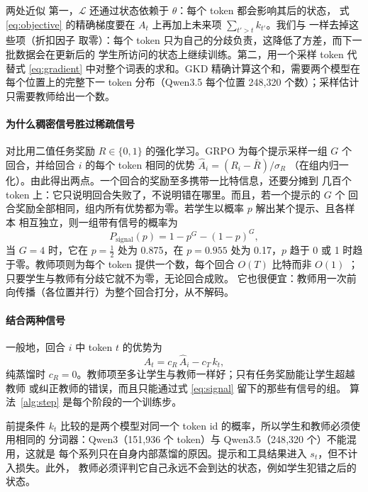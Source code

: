 \documentclass[11pt,a4paper,fontset=none]{ctexart}
\begin{document}
\begin{notebox}{两处近似}
第一，$\mathcal{L}$ 还通过状态依赖于 $\theta$：每个 token 都会影响其后的状态，
式 \eqref{eq:objective} 的精确梯度要在 $A_t$ 上再加上未来项
$\sum_{t'>t}k_{t'}$。我们与 \citet{lu2025onpolicy} 一样去掉这些项（折扣因子
取零）：每个 token 只为自己的分歧负责，这降低了方差，而下一批数据会在更新后的
学生所访问的状态上继续训练。第二，用一个采样 token 代替式 \eqref{eq:gradient}
中对整个词表的求和。GKD \citep{agarwal2024gkd} 精确计算这个和，需要两个模型在
每个位置上的完整下一 token 分布（Qwen3.5 每个位置 248{,}320 个数）；采样估计
只需要教师给出一个数。
\end{notebox}

\paragraph{为什么稠密信号胜过稀疏信号}
对比用二值任务奖励 $R\in\{0,1\}$ 的强化学习。GRPO 为每个提示采样一组 $G$ 个
回合，并给回合 $i$ 的每个 token 相同的优势 $\hat A_i=(R_i-\bar R)/\sigma_R$
（在组内归一化）。由此得出两点。一个回合的奖励至多携带一比特信息，还要分摊到
几百个 token 上：它只说明回合失败了，不说明错在哪里。而且，若一个提示的 $G$ 个
回合奖励全部相同，组内所有优势都为零。若学生以概率 $p$ 解出某个提示、且各样本
相互独立，则一组带有信号的概率为
\begin{equation}
  P_{\text{signal}}(p) = 1 - p^G - (1-p)^G ,
  \label{eq:signal}
\end{equation}
当 $G=4$ 时，它在 $p=\tfrac12$ 处为 0.875，在 $p=0.955$ 处为 0.17，$p$ 趋于 0
或 1 时趋于零。教师项则为每个 token 提供一个数，每个回合 $O(T)$ 比特而非
$O(1)$ \citep{lu2025onpolicy}；只要学生与教师有分歧它就不为零，无论回合成败。
它也很便宜：教师用一次前向传播（各位置并行）为整个回合打分，从不解码。

\paragraph{结合两种信号}
一般地，回合 $i$ 中 token $t$ 的优势为
\begin{equation}
  A_t = c_R\,\hat A_i - c_T\,k_t ,
  \label{eq:advantage}
\end{equation}
纯蒸馏时 $c_R=0$。教师项至多让学生与教师一样好；只有任务奖励能让学生超越教师
或纠正教师的错误，而且只能通过式 \eqref{eq:signal} 留下的那些有信号的组。
算法~\ref{alg:step} 是每个阶段的一个训练步。

\begin{notebox}{前提条件}
$k_t$ 比较的是两个模型对同一个 token id 的概率，所以学生和教师必须使用相同的
分词器：Qwen3（151{,}936 个 token）与 Qwen3.5（248{,}320 个）不能混用，这就是
每个系列只在自身内部蒸馏的原因。提示和工具结果进入 $s_t$，但不计入损失。此外，
教师必须评判它自己永远不会到达的状态，例如学生犯错之后的状态。
\end{notebox}
\end{document}
